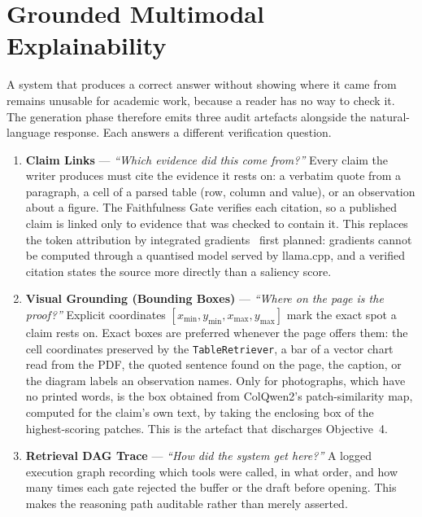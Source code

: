 \section{Grounded Multimodal Explainability}
\label{sec:explainability}

A system that produces a correct answer without showing where it came from remains
unusable for academic work, because a reader has no way to check it. The generation
phase therefore emits three audit artefacts alongside the natural-language response.
Each answers a different verification question.

\begin{enumerate}
    \item \textbf{Claim Links} --- \emph{``Which evidence did this come from?''}
    Every claim the writer produces must cite the evidence it rests on: a verbatim
    quote from a paragraph, a cell of a parsed table (row, column and value), or an
    observation about a figure. The Faithfulness Gate verifies each citation, so a
    published claim is linked only to evidence that was checked to contain it. This
    replaces the token attribution by integrated gradients~\cite{sundararajan2017axiomatic}
    first planned: gradients cannot be computed through a quantised model served by
    llama.cpp, and a verified citation states the source more directly than a
    saliency score.

    \item \textbf{Visual Grounding (Bounding Boxes)} --- \emph{``Where on the page is
    the proof?''} Explicit coordinates $[x_{\min}, y_{\min}, x_{\max}, y_{\max}]$
    mark the exact spot a claim rests on. Exact boxes are preferred whenever the
    page offers them: the cell coordinates preserved by the \texttt{TableRetriever},
    a bar of a vector chart read from the PDF, the quoted sentence found on the page,
    the caption, or the diagram labels an observation names. Only for photographs,
    which have no printed words, is the box obtained from ColQwen2's
    patch-similarity map, computed for the claim's own text, by taking the enclosing
    box of the highest-scoring patches. This is the artefact that discharges
    Objective~4.

    \item \textbf{Retrieval DAG Trace} --- \emph{``How did the system get here?''} A
    logged execution graph recording which tools were called, in what order, and how
    many times each gate rejected the buffer or the draft before opening. This makes
    the reasoning path auditable rather than merely asserted.
\end{enumerate}

